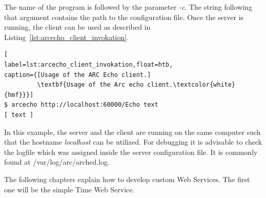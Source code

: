 %
%
The name of the program is followed by the parameter \textit{-c}.
The string following that argument contains the path to the configuration file.
Once the server is running, the client can be used as described in Listing~\ref{lst:arcecho_client_invokation}.
\begin{lstlisting}[
label=lst:arcecho_client_invokation,float=htb,
caption={[Usage of the ARC Echo client.]
         \textbf{Usage of the Arc echo client.\textcolor{white}{hmf}}}]
$ arcecho http://localhost:60000/Echo text
[ text ]
\end{lstlisting}

In this example, the server and the client are running on the same computer such that the hostname \textit{localhost} can be utilized. 
For debugging it is advisable to check the logfile which was assigned inside the server configuration file.
It is commonly found at /var/log/arc/arched.log.

The following chapters explain how to develop custom Web Services.
The first one will be the simple Time Web Service.













